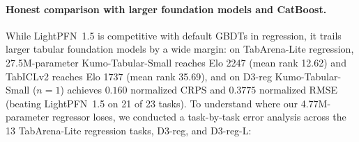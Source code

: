 \documentclass[11pt]{article}
\begin{document}
\paragraph{Honest comparison with larger foundation models and CatBoost.}
While LightPFN~1.5 is competitive with default GBDTs in regression, it trails larger tabular foundation models by a wide margin: on TabArena-Lite regression, 27.5M-parameter Kumo-Tabular-Small \cite{kumo} reaches Elo 2247 (mean rank 12.62) and TabICLv2 \cite{tabiclv2} reaches Elo 1737 (mean rank 35.69), and on D3-reg Kumo-Tabular-Small ($n=1$) achieves $0.160$ normalized CRPS and $0.3775$ normalized RMSE (beating LightPFN~1.5 on 21 of 23 tasks). %
To understand where our 4.77M-parameter regressor loses, we conducted a task-by-task error analysis across the 13 TabArena-Lite regression tasks, D3-reg, and D3-reg-L: %
\end{document}
